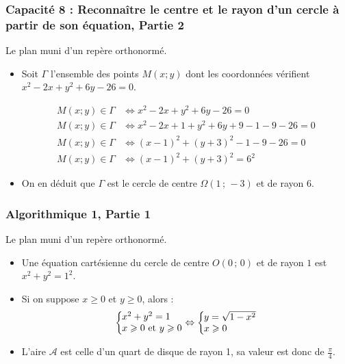 \documentclass[11pt, hyperref={urlcolor=red,%
            linkcolor=blue, %
            colorlinks=true}]{beamer}
\newcommand{\Coord}[2]{\left(#1\, ;\, #2\right)}
\newcommand{\sys}[2]{
\left\lbrace
 \begin{array}{l}
  \negthickspace\negthickspace #1\\
  \negthickspace\negthickspace #2\\
 \end{array}
\right.\negthickspace\negthickspace}
\begin{document}
\begin{frame}

\frametitle{Capacité 8 : Reconnaître le centre et le rayon d’un cercle à partir de son équation, Partie 2}
Le plan muni d'un repère orthonormé.

\begin{itemize}
\pause \item Soit $\Gamma$ l'ensemble des points $M(x;y)$ dont les coordonnées vérifient $x^{2}-2x+y^{2}+6y-26=0$.   


\begin{align*}
M(x;y) \in \Gamma  &\Leftrightarrow x^{2}-2x+y^{2}+6y-26=0 \\
M(x;y) \in \Gamma  &\Leftrightarrow x^{2}-2x+1+y^{2}+6y+9-1-9-26=0 \\
M(x;y) \in \Gamma  &\Leftrightarrow (x-1)^{2}+(y+3)^{2}-1-9-26=0 \\
M(x;y) \in \Gamma  &\Leftrightarrow (x-1)^{2}+(y+3)^{2}=6^{2}
\end{align*}

\pause \item On en déduit que $\Gamma$ est le cercle de centre $\Omega\Coord{1}{-3}$ et de rayon $6$.
\end{itemize}
\end{frame}


\begin{frame}
\label{algorithmique1}
\frametitle{Algorithmique 1, Partie 1}
Le plan muni d'un repère orthonormé.

\begin{itemize}
\pause \item Une équation cartésienne du cercle de centre $O\Coord{0}{0}$ et de rayon $1$ est $x^{2}+y^{2}=1^{2}$.
\pause \item Si on suppose $x \geqslant 0$ et $y \geqslant 0$, alors : 
$$\sys{x^2+y^2 =1}{x \geqslant 0 \text{ et } y \geqslant 0} \Leftrightarrow \sys{y= \sqrt{1-x^{2}}}{x \geqslant 0}$$
\pause \item L'aire $\mathcal{A}$ est celle d'un quart de disque de rayon 1, sa valeur est donc de $\frac{\pi}{4}$.
\end{itemize}
\end{frame}
\end{document}
